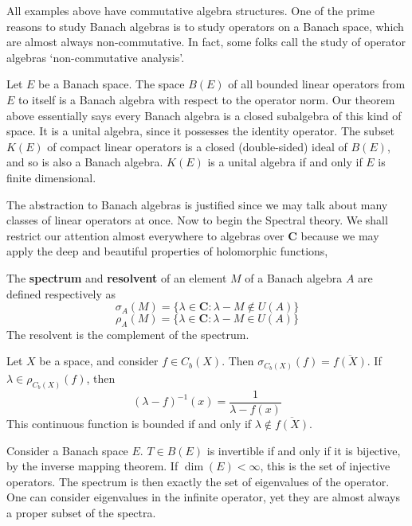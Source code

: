 All examples above have commutative algebra structures. One of the prime reasons to study Banach algebras is to study operators on a Banach space, which are almost always non-commutative. In fact, some folks call the study of operator algebras `non-commutative analysis'.

\begin{example}
    Let $E$ be a Banach space. The space $B(E)$ of all bounded linear operators from $E$ to itself is a Banach algebra with respect to the operator norm. Our theorem above essentially says every Banach algebra is a closed subalgebra of this kind of space. It is a unital algebra, since it possesses the identity operator. The subset $K(E)$ of compact linear operators is a closed (double-sided) ideal of $B(E)$, and so is also a Banach algebra. $K(E)$ is a unital algebra if and only if $E$ is finite dimensional.
\end{example}

The abstraction to Banach algebras is justified since we may talk about many classes of linear operators at once. Now to begin the Spectral theory. We shall restrict our attention almost everywhere to algebras over $\mathbf{C}$ because we may apply the deep and beautiful properties of holomorphic functions,

\begin{definition}
    The {\bf spectrum} and {\bf resolvent} of an element $M$ of a Banach algebra $A$ are defined respectively as
    \[ \sigma_{A}(M) = \{ \lambda \in \mathbf{C} : \lambda - M \not \in U(A) \} \]
    \[ \rho_{A}(M) = \{ \lambda \in \mathbf{C} : \lambda - M \in U(A) \} \]
    The resolvent is the complement of the spectrum.
\end{definition}

\begin{example}
    Let $X$ be a space, and consider $f \in C_b(X)$. Then $\sigma_{C_b(X)}(f) = \overline{f(X)}$. If $\lambda \in \rho_{C_b(X)}(f)$, then
    \[ (\lambda - f)^{-1}(x) = \frac{1}{\lambda - f(x)} \]
    This continuous function is bounded if and only if $\lambda \not \in \overline{f(X)}$.
\end{example}

\begin{example}
    Consider a Banach space $E$. $T \in B(E)$ is invertible if and only if it is bijective, by the inverse mapping theorem. If $\dim(E) < \infty$, this is the set of injective operators. The spectrum is then exactly the set of eigenvalues of the operator. One can consider eigenvalues in the infinite operator, yet they are almost always a proper subset of the spectra.
\end{example}

